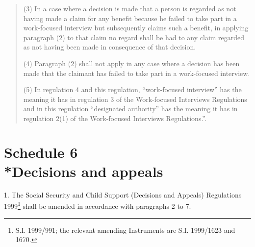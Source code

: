\documentclass[12pt,a4paper]{article}
\begin{document}
\begin{quotation}
(3) In a case where a decision is made that a person is regarded as not having made a claim for any benefit because he failed to take part in a work-focused interview but subsequently claims such a benefit, in applying paragraph (2) to that claim no regard shall be had to any claim regarded as not having been made in consequence of that decision.

(4) Paragraph (2) shall not apply in any case where a decision has been made that the claimant has failed to take part in a work-focused interview.

(5) In regulation 4 and this regulation, “work-focused interview” has the meaning it has in regulation 3 of the Work-focused Interviews Regulations and in this regulation “designated authority” has the meaning it has in regulation 2(1) of the Work-focused Interviews Regulations.”.
\end{quotation}

\part[Schedule 6 --- Decisions and appeals]{Schedule 6\\*Decisions and appeals}

\renewcommand\parthead{--- Schedule 6}

1.  The Social Security and Child Support (Decisions and Appeals) Regulations 1999\footnote{\frenchspacing S.I. 1999/991; the relevant amending Instruments are S.I. 1999/1623 and 1670.} shall be amended in accordance with paragraphs 2 to 7.

\medskip
\end{document}
